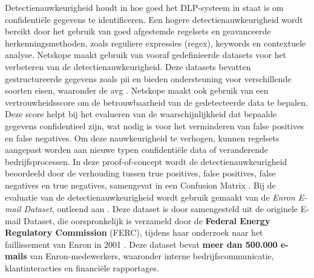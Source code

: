 Detectienauwkeurigheid houdt in hoe goed het DLP-systeem in staat is om confidentiële gegevens te identificeren. 
Een hogere detectienauwkeurigheid wordt bereikt door het gebruik van goed afgestemde regelsets en geavanceerde herkenningsmethoden, zoals reguliere expressies (regex), keywords en contextuele analyse.
Netskope maakt gebruik van vooraf gedefinieerde datasets voor het verbeteren van de detectienauwkeurigheid. 
Deze datasets bevatten gestructureerde gegevens zoals \gls{pii} en bieden ondersteuning voor verschillende soorten eisen, waaronder de \gls{avg} \autocite{Clementelli2023}. 
Netskope maakt ook gebruik van een vertrouwheidsscore om de betrouwbaarheid van de gedetecteerde data te bepalen. 
Deze score helpt bij het evalueren van de waarschijnlijkheid dat bepaalde gegevens confidentieel zijn, 
wat nodig is voor het verminderen van false positives en false negatives. 
Om deze nauwkeurigheid te verhogen, kunnen regelsets aangepast worden aan nieuwe typen confidentiële data of veranderende bedrijfsprocessen.
In deze proof-of-concept wordt de detectienauwkeurigheid beoordeeld door de verhouding tussen true positives, false positives, 
false negatives en true negatives, samengevat in een Confusion Matrix \autocite{Microsoftn.d.}.
Bij de evaluatie van de detectienauwkeurigheid wordt gebruik gemaakt van de \textit{Enron E-mail Dataset}, ontleend aan \textcite{Cukierski2015Enron}.
Deze dataset is door \textcite{Cukierski2015Enron} samengesteld uit de originele \textcite{Enron2015} E-mail Dataset, die oorspronkelijk is verzameld door de \textbf{Federal Energy Regulatory Commission} (FERC), 
tijdens haar onderzoek naar het faillissement van Enron in 2001 \autocite{Wade2003, Healy2003}.
Deze dataset bevat \textbf{meer dan 500.000 e-mails} van Enron-medewerkers, waaronder interne bedrijfscommunicatie, klantinteracties en financiële rapportages.





